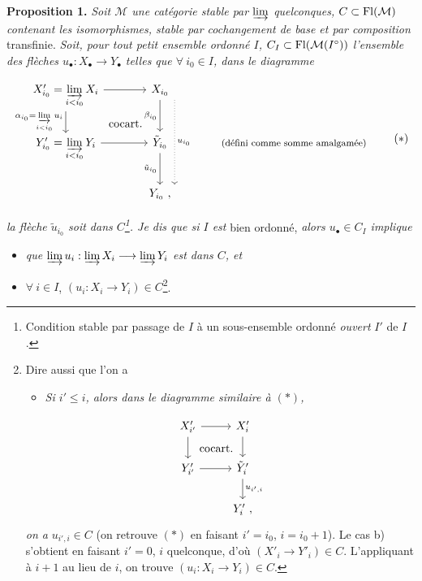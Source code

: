 \textbf{Proposition 1.} \textit{Soit $\mathcal{M}$ une catégorie stable par $\varinjlim$ quelconques, $C \subset \mathrm{Fl}(\mathcal{M})$ contenant les isomorphismes, stable par cochangement de base et par composition} transfinie. \textit{Soit, pour tout petit ensemble ordonné $I$, $C_I \subset \mathrm{Fl}(\mathcal{M}(I^{\circ}))$ l'ensemble des flèches $u_\bullet : X_\bullet \longrightarrow Y_\bullet$ telles que $\forall\ i_0 \in I$, dans le diagramme} %

\[
\begin{tikzcd}[column sep=large]
X'_{i_0} = \varinjlim\limits_{i<i_0} X_i \arrow[r] \arrow[d, "\alpha_{i_0} = \varinjlim\limits_{i<i_0} u_i"'] \arrow[dr, phantom, "\text{cocart.}"] & X_{i_0} \arrow[d, "\beta_{i_0}"'] \arrow[dd, dotted, shift left=3ex, "u_{i_0}"] & \\
Y'_{i_0} = \varinjlim\limits_{i<i_0} Y_i \arrow[r] & \tilde{Y}_{i_0} \arrow[d, "\tilde{u}_{i_0}"'] & \text{\footnotesize (défini comme somme amalgamée)} \\
& Y_{i_0}\ , &
\end{tikzcd}
\tag*{$(*)$}
\]

\textit{la flèche $\tilde{u}_{i_0}$ soit dans $C$\footnote{Condition stable par passage de $I$ à un sous-ensemble ordonné \textit{ouvert} $I'$ de $I$.}. Je dis que si $I$ est} bien ordonné, \textit{alors $u_\bullet \in C_I$ implique}
\begin{itemize}[leftmargin=2.5em]
\item[a)] \textit{que $\varinjlim u_i : \varinjlim X_i \longrightarrow \varinjlim Y_i$ est dans $C$, et}
\item[b)] $\forall\ i \in I$, $(u_i : X_i \longrightarrow Y_i) \in C$\footnote{Dire aussi que l'on a
\begin{itemize}[leftmargin=2em]
\item[b$'$)] \textit{Si $i' \leq i$, alors dans le diagramme similaire à $(*)$,}
\end{itemize}
\[
\begin{tikzcd}[ampersand replacement=\&]
X'_{i'} \arrow[r] \arrow[d] \arrow[dr, phantom, "\text{cocart.}"] \& X'_i \arrow[d] \\
Y'_{i'} \arrow[r] \& \tilde{Y}'_i \arrow[d, "u_{i',i}"] \\
\& Y'_i\ ,
\end{tikzcd}
\]
\textit{on a} $u_{i',i} \in C$ (on retrouve $(*)$ en faisant $i' = i_0$, $i = i_0 + 1$). Le cas b) s'obtient en faisant $i' = 0$, $i$ quelconque, d'où $(X'_i \longrightarrow Y'_i) \in C$. L'appliquant à $i+1$ au lieu de $i$, on trouve $(u_i : X_i \longrightarrow Y_i) \in C$.}.
\end{itemize}

